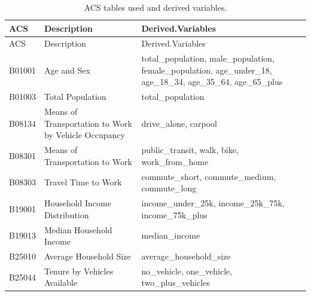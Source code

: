 \documentclass[
  number,
  review,
  3p]{elsarticle}
\begin{document}
\begin{longtable}[]{@{}
  >{\raggedright\arraybackslash}p{}
  >{\raggedright\arraybackslash}p{}
  >{\raggedright\arraybackslash}p{}@{}}
\caption{ACS tables used and derived variables.}\tabularnewline
\toprule\noalign{}
\begin{minipage}[b]{\linewidth}\raggedright
ACS
\end{minipage} & \begin{minipage}[b]{\linewidth}\raggedright
Description
\end{minipage} & \begin{minipage}[b]{\linewidth}\raggedright
Derived.Variables
\end{minipage} \\
\midrule\noalign{}
\endfirsthead
\toprule\noalign{}
\begin{minipage}[b]{\linewidth}\raggedright
ACS
\end{minipage} & \begin{minipage}[b]{\linewidth}\raggedright
Description
\end{minipage} & \begin{minipage}[b]{\linewidth}\raggedright
Derived.Variables
\end{minipage} \\
\midrule\noalign{}
\endhead
\bottomrule\noalign{}
\endlastfoot
B01001 & Age and Sex & total\_population, male\_population,
female\_population, age\_under\_18, age\_18\_34, age\_35\_64,
age\_65\_plus \\
B01003 & Total Population & total\_population \\
B08134 & Means of Transportation to Work by Vehicle Occupancy &
drive\_alone, carpool \\
B08301 & Means of Transportation to Work & public\_transit, walk, bike,
work\_from\_home \\
B08303 & Travel Time to Work & commute\_short, commute\_medium,
commute\_long \\
B19001 & Household Income Distribution & income\_under\_25k,
income\_25k\_75k, income\_75k\_plus \\
B19013 & Median Household Income & median\_income \\
B25010 & Average Household Size & average\_household\_size \\
B25044 & Tenure by Vehicles Available & no\_vehicle, one\_vehicle,
two\_plus\_vehicles \\

\end{longtable}
\end{document}
